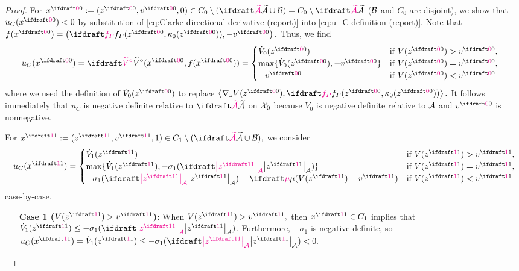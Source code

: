 {\begin{proof}
    For $x\sszero := (z\sszero, v\sszero, 0) \in C_0 \setminus (\calAX \union \calB) 
	= C_0 \setminus \calAX$ (${\mathcal{B}}$ and $C_0$ are disjoint),
    we show that $u_C(x\sszero) < 0$ 
    by substitution of \cref{eq:Clarke directional derivative (report)} 
    into \cref{eq:u_C definition (report)}.
    Note that 
    $f(x\sszero) = \left( \fp(z\sszero, \kappa_0(z\sszero)), -v\sszero \right).$ 
    Thus, 
    we find
    \begin{equation}
        \begin{aligned}
        u_C(x\sszero) &= \tVc(x\sszero, f(x\sszero)) 
        = \begin{cases}
                               \dot V_0(z\sszero) & \textif V(z\sszero) > v\sszero, \\
            \max\{\dot V_0(z\sszero), -v\sszero\} & \textif V(z\sszero) = v\sszero, \\
                                        -v\sszero & \textif V(z\sszero) < v\sszero
        \end{cases}
        \end{aligned}
        \label{eq:u_c of x_0}
    \end{equation}
    where we used the definition of $\dot{V}_0(z\sszero)$ to replace 
    $\ip{\del_z V(z\sszero)}{\fp(z\sszero, \kappa_0(z\sszero))}.$
    It follows immediately that $u_C$ is negative definite relative to $\calAX$ on ${\mathcal{X}}_0$
    because $\dot V_0$ is negative definite relative to ${\mathcal{A}}$ and 
    $v\sszero$ is nonnegative.
    
    For $x\ssone := (z\ssone, v\ssone, 1) \in C_1 \setminus(\calAX \union \calB),$
    we consider
    \begin{equation}
        u_C(x\ssone) 
        = \begin{cases}
                                                \dot V_1(z\ssone) & \textif V(z\ssone) > v\ssone, \\
            \max\{\dot V_1(z\ssone), -\sigma_1(\distA{z\ssone})\} & \textif V(z\ssone) = v\ssone, \\
            -\sigma_1(\distA{z\ssone}) + \vdiffcoeff(V(z\ssone) - v\ssone)
                                                                  & \textif V(z\ssone) < v\ssone
        \end{cases}
        \label{eq:u_c of x_1}
    \end{equation}
    case-by-case.
    \begin{itemize}
        \item[\textbf{Case 1 ($V(z\ssone) > v\ssone$):}] 
        When $V(z\ssone) > v\ssone,$ then
        $x\ssone \in C_1$ implies that 
        $\dot V_1(z\ssone) \leq -\sigma_1(\distA{z\ssone})$. 
        Furthermore, $-\sigma_1$ is negative definite,
        so $u_C(x\ssone) = \dot V_1(z\ssone) \leq -\sigma_1(\distA{z\ssone}) < 0.$



\end{itemize}
\end{proof}}
